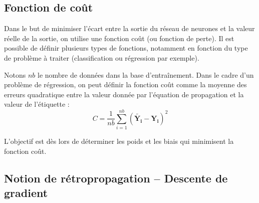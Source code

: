 \subsection{Fonction de coût}
Dans le but de minimiser l'écart entre la sortie du réseau de neurones et la valeur réelle de la sortie, on utilise une fonction coût (ou fonction de perte). Il est possible de définir plusieurs types de fonctions, notamment en fonction du type de problème à traiter (classification ou régression par exemple).

\begin{defi}
Notons $nb$ le nombre de données dans la base d'entraînement. Dans le cadre d'un problème de régression, on peut définir la fonction coût comme la moyenne des erreurs quadratique entre la valeur donnée par l'équation de propagation et la valeur de l'étiquette :
$$
C = \dfrac{1}{nb} \sum \limits_{i=1}^{nb} \left( \mathbf{\tilde{Y_i}} - \mathbf{Y_i}  \right)^2
$$
\end{defi}
\begin{obj}
L'objectif est dès lors de déterminer les poids et les biais qui minimisent la fonction coût.
\end{obj}



\subsection{Notion de rétropropagation -- Descente de gradient}

